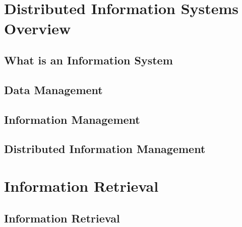 \documentclass[a4paper]{article}
\title{\vspace{-.25cm} \HWTitle \\ \vspace{.25cm}}
\author{\HWAuthorName}
\begin{document}
\maketitle

\section{Distributed Information Systems Overview} %
  \label{sec:distributed_information_systems_overview}

  \subsection{What is an Information System} %
  \label{sub:what_is_an_information_system}

  \subsection{Data Management} %
  \label{sub:data_management}

  \subsection{Information Management} %
  \label{sub:information_management}

  \subsection{Distributed Information Management} %
  \label{sub:distributed_information_management}

\section{Information Retrieval} %
\label{sec:information_retrieval_vector_space_retrieval}

  \subsection{Information Retrieval} %
  \label{sub:information_retrieval}
\end{document}
